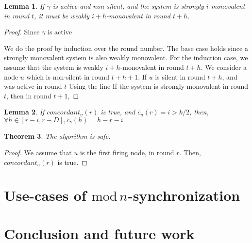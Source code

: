 \documentclass[11pt,letterpaper]{article}
\newtheorem{thm}{Theorem}
\newtheorem{lem}[thm]{Lemma}
\newcommand{\cent}{\gamma}
\begin{document}
\begin{lem}
	If $\cent$ is active and non-silent, and the system is strongly $i$-monovalent in round $t$, it must be weakly $i+h$-monovalent in round $t+h$.
\end{lem}
\begin{proof}
	Since $\cent$ is active

	We do the proof by induction over the round number. The base case holds since a strongly monovalent system is also weakly monovalent.
	For the induction case, we assume that the system is weakly $i+h$-monovalent in round $t+h$.
	We consider a node $u$ which is non-silent in round $t+h+1$.
	If $u$ is silent in round $t+h$, and was active in round $t$
	Using the line 
	If the system is strongly monovalent in round $t$, then in round $t+1$, 
\end{proof}


\begin{lem}
	If $concordant_u(r)$ is true, and $\overline{c}_u(r) = i > k/2$, then, $\forall h \in [r-i, r-D], \overline{c}_\cent(h) = h-r-i$
\end{lem}

\begin{thm} \label{lem:safety} 
	The algorithm is safe.
\end{thm}
\begin{proof}
	We assume that $u$ is the first firing node, in round $r$.
	Then, $concordant_u(r)$ is true.
\end{proof}

\section{Use-cases of $\mathrm{mod}\,n$-synchronization}

\section{Conclusion and future work}


\printbibliography
\end{document}
